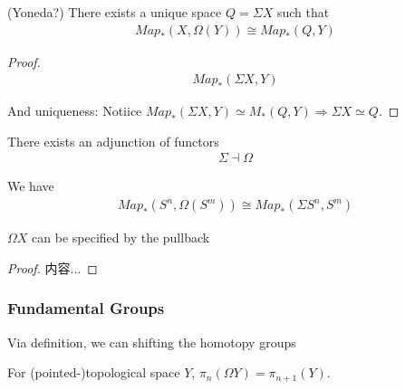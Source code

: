 \documentclass[Total.tex]{subfiles}
\begin{document}
				\begin{proposition}
					(Yoneda?) There exists a unique space $Q=\Sigma X$ such that
					\begin{gather*}
						Map_*(X,\Omega(Y))\cong Map_*(Q,Y)
					\end{gather*}
				\end{proposition}
				\begin{proof}
					\begin{gather*}
						Map_*(\Sigma X,Y)
					\end{gather*}
					
					And uniqueness: Notiice $Map_*(\Sigma X,Y)\simeq M_*(Q,Y)\Rightarrow \Sigma X\simeq Q$.
				\end{proof}
				
				\begin{corollary}
					There exists an adjunction of functors
					\begin{gather*}
						\Sigma \dashv \Omega
					\end{gather*}
				\end{corollary}
				
				\begin{corollary}
					We have
					\begin{gather*}
						Map_*(S^n,\Omega(S^m))\cong Map_*(\Sigma S^n,S^m)
					\end{gather*}
				\end{corollary}
				
				\begin{proposition}
					$\Omega X$ can be specified by the pullback
					\begin{center}
					\end{center}
				\end{proposition}
				\begin{proof}
					内容...
				\end{proof}
				\subsubsection{Fundamental Groups}
					Via definition, we can shifting the homotopy groups
					\begin{proposition}
						For (pointed-)topological space $Y$, $\pi_n(\Omega Y)=\pi_{n+1} (Y)$.
					\end{proposition}
\end{document}

